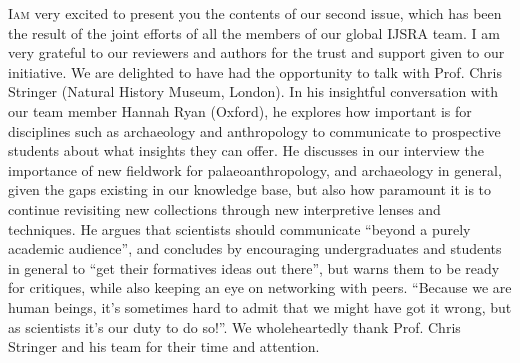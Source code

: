 \def\IJSRAidentifier{\currfilebase} %
\def\shorttitle{Issue Presentation}
\def\maintitle{Presentation of the Second Issue of IJSRA}
\def\cmail{gonzalo.linaresmatas@st-hughs.ox.ac.uk}
\def\authorone{Gonzalo Linares Matás}
\def\bioone{\authorone is a third-year undergraduate student reading the BA Archaeology \& Anthropology at St~Hugh’s College, University of Oxford (UK). 
He was the former President of the Oxford University Archaeology Society (Michaelmas 2015), and he has recently been invited to join the WAC (World Archaeology Congress) Student Committee. 
He is particularly interested in the socio-political contexts of heritage management and ownership, contemporary archaeological theory, and the histories of the academic disciplines of archaeology and anthropology as practical modes of inquiry. 
He is doing his undergraduate dissertation on the socio-economic dimensions of early bone technology, focusing on the late Early Pleistocene assemblage at the site of Cueva Negra del Estrecho del Río Quípar (Murcia, Spain). 
He is also very interested in transforming the academic publishing landscape.}
\def\affilone{Executive Editor, International Journal of Student Research in Archaeology
\\St. Hugh’s College, University of Oxford}


\IJSRAopening%
\lettrine{I}{am} very excited to present you the contents of our second issue, which has been the result of the joint efforts of all the members of our global IJSRA team. I am very grateful to our reviewers and authors for the trust and support given to our initiative.
We are delighted to have had the opportunity to talk with Prof. Chris Stringer (Natural History Museum, London). In his insightful conversation with our team member Hannah Ryan (Oxford), he explores how important is for disciplines such as archaeology and anthropology to communicate to prospective students about what insights they can offer. He discusses in our interview the importance of new fieldwork for palaeoanthropology, and archaeology in general, given the gaps existing in our knowledge base, but also how paramount it is to continue revisiting new collections through new interpretive lenses and techniques. He argues that scientists should communicate “beyond a purely academic audience”, and concludes by encouraging undergraduates and students in general to “get their formatives ideas out there”, but warns them to be ready for critiques, while also keeping an eye on networking with peers. “Because we are human beings, it’s sometimes hard to admit that we might have got it wrong, but as scientists it’s our duty to do so!”. We wholeheartedly thank Prof. Chris Stringer and his team for their time and attention.

